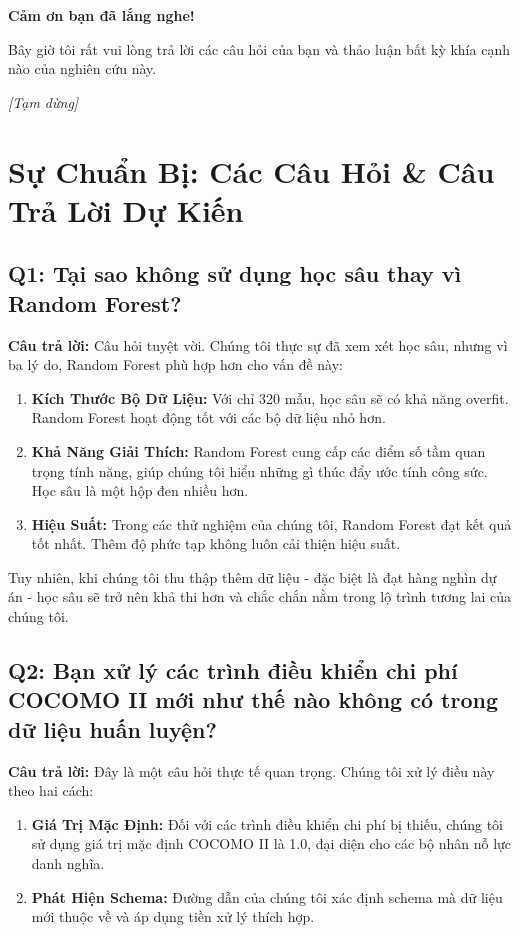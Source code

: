 \documentclass[12pt,a4paper]{article}
\newcommand{\pause}{\textit{[Tạm dừng]}}
\begin{document}
\textbf{Cảm ơn bạn đã lắng nghe!}

Bây giờ tôi rất vui lòng trả lời các câu hỏi của bạn và thảo luận bất kỳ khía cạnh nào của nghiên cứu này.

\pause

\section*{Sự Chuẩn Bị: Các Câu Hỏi \& Câu Trả Lời Dự Kiến}

\subsection*{Q1: Tại sao không sử dụng học sâu thay vì Random Forest?}

\textbf{Câu trả lời:} Câu hỏi tuyệt vời. Chúng tôi thực sự đã xem xét học sâu, nhưng vì ba lý do, Random Forest phù hợp hơn cho vấn đề này:

\begin{enumerate}
    \item \textbf{Kích Thước Bộ Dữ Liệu:} Với chỉ 320 mẫu, học sâu sẽ có khả năng overfit. Random Forest hoạt động tốt với các bộ dữ liệu nhỏ hơn.
    \item \textbf{Khả Năng Giải Thích:} Random Forest cung cấp các điểm số tầm quan trọng tính năng, giúp chúng tôi hiểu những gì thúc đẩy ước tính công sức. Học sâu là một hộp đen nhiều hơn.
    \item \textbf{Hiệu Suất:} Trong các thử nghiệm của chúng tôi, Random Forest đạt kết quả tốt nhất. Thêm độ phức tạp không luôn cải thiện hiệu suất.
\end{enumerate}

Tuy nhiên, khi chúng tôi thu thập thêm dữ liệu - đặc biệt là đạt hàng nghìn dự án - học sâu sẽ trở nên khả thi hơn và chắc chắn nằm trong lộ trình tương lai của chúng tôi.

\subsection*{Q2: Bạn xử lý các trình điều khiển chi phí COCOMO II mới như thế nào không có trong dữ liệu huấn luyện?}

\textbf{Câu trả lời:} Đây là một câu hỏi thực tế quan trọng. Chúng tôi xử lý điều này theo hai cách:

\begin{enumerate}
    \item \textbf{Giá Trị Mặc Định:} Đối với các trình điều khiển chi phí bị thiếu, chúng tôi sử dụng giá trị mặc định COCOMO II là 1.0, đại diện cho các bộ nhân nỗ lực danh nghĩa.
    \item \textbf{Phát Hiện Schema:} Đường dẫn của chúng tôi xác định schema mà dữ liệu mới thuộc về và áp dụng tiền xử lý thích hợp.
\end{enumerate}
\end{document}
